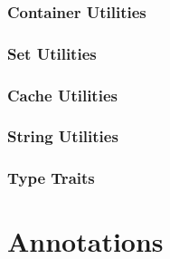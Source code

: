 \subsubsection{Container Utilities}
\subsubsection{Set Utilities}
\subsubsection{Cache Utilities}
\subsubsection{String Utilities}
\subsubsection{Type Traits}




\section{Annotations}
\label{sec:Compiler.Core.Annotations}




